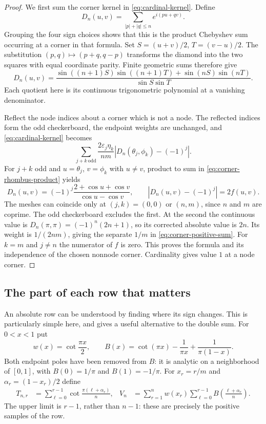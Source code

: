 \begin{proof}
We first sum the corner kernel in \eqref{eq:cardinal-kernel}.  Define
\[
 D_n(u,v)=\sum_{|p|+|q|\leq n}e^{i(pu+qv)}.
\]
Grouping the four sign choices shows that this is the product
Chebyshev sum occurring at a corner in that formula.  Set
$S=(u+v)/2$, $T=(v-u)/2$.  The substitution
$(p,q)\mapsto(p+q,q-p)$ transforms the diamond into the two squares
with equal coordinate parity.  Finite geometric sums therefore give
\begin{equation}\label{eq:corner-rhombus-product}
 D_n(u,v)=
 \frac{\sin((n+1)S)\sin((n+1)T)+\sin(nS)\sin(nT)}
 {\sin S\sin T}.
\end{equation}
Each quotient here is its continuous trigonometric polynomial at a
vanishing denominator.

Reflect the node indices about a corner which is not a node.  The
reflected indices form the odd checkerboard, the endpoint weights are
unchanged, and \eqref{eq:cardinal-kernel} becomes
\[
 \sum_{j+k\ \mathrm{odd}}\frac{2\varepsilon_j\eta_k}{nm}
       |D_n(\theta_j,\phi_k)-(-1)^j|.
\]
For $j+k$ odd and $u=\theta_j$, $v=\phi_k$ with $u\ne v$,
product to sum in \eqref{eq:corner-rhombus-product} yields
\[
 D_n(u,v)=(-1)^j\frac{2+\cos u+\cos v}{\cos u-\cos v},
 \qquad |D_n(u,v)-(-1)^j|=2f(u,v).
\]
The meshes can coincide only at $(j,k)=(0,0)$ or $(n,m)$, since
$n$ and $m$ are coprime.  The odd checkerboard excludes the first.
At the second the continuous value is
$D_n(\pi,\pi)=(-1)^n(2n+1)$, so its corrected absolute value is
$2n$.  Its weight is $1/(2nm)$, giving the separate $1/m$ in
\eqref{eq:corner-positive-sum}.  For $k=m$ and $j\ne n$ the numerator
of $f$ is zero.  This proves the formula and its independence of the
chosen nonnode corner.  Cardinality gives value $1$ at a node corner.
\end{proof}

\subsection{The part of each row that matters}

An absolute row can be understood by finding where its sign changes.
This is particularly simple here, and gives a useful alternative to
the double sum.  For $0<x<1$ put
\begin{equation}\label{eq:corner-w-B}
 w(x)=\cot\frac{\pi x}{2},\qquad
 B(x)=\cot(\pi x)-\frac1{\pi x}+\frac1{\pi(1-x)}.
\end{equation}
Both endpoint poles have been removed from $B$: it is analytic on a
neighborhood of $[0,1]$, with $B(0)=1/\pi$ and $B(1)=-1/\pi$.
For $x_r=r/m$ and $\alpha_r=(1-x_r)/2$ define
\begin{align}
 T_{n,r}&=\sum_{\ell=0}^{r-1}
             \cot\frac{\pi(\ell+\alpha_r)}n,
 &V_n&=\sum_{r=1}^n w(x_r)
             \sum_{\ell=0}^{r-1}B\!\left(\frac{\ell+\alpha_r}{n}\right).
 \label{eq:corner-partial-rows}
\end{align}
The upper limit is $r-1$, rather than $n-1$: these are precisely the
positive samples of the row.

